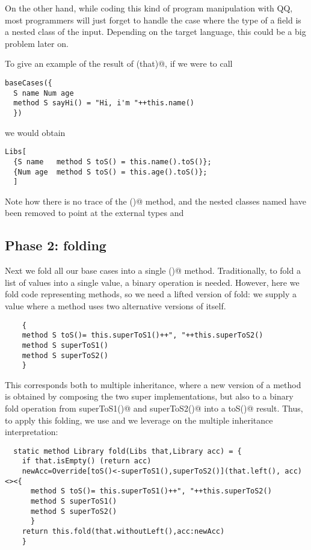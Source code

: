  On the other hand, while coding this kind of program manipulation with QQ, most programmers
 will just forget to handle the case where the type of a field is a nested class of the input.
 Depending on the target language, this could be a big problem later on.


To give an example of the result of \Q@baseCases(that)@, if we were to call 

\begin{lstlisting}
baseCases({
  S name Num age
  method S sayHi() = "Hi, i'm "++this.name()
  })
\end{lstlisting}

 we would obtain

\begin{lstlisting}
Libs[
  {S name   method S toS() = this.name().toS()};
  {Num age  method S toS() = this.age().toS()};
  ]
\end{lstlisting}

Note how there is no trace of the \Q@sayHi()@ method, and the
nested classes named \Q@T@ have been removed to point at the
external types \Q@S@ and \Q@Num@


\subsection*{Phase 2: folding}
Next we fold all our base cases into a single \Q@toS()@ method.
Traditionally, to fold a list of values into a single value, a binary operation is needed.
However, here we fold code representing methods,
so we need a lifted version of fold:
 we supply a \Q@Library@ value where a method
uses two alternative versions of itself. 

\begin{lstlisting}
    {
    method S toS()= this.superToS1()++", "++this.superToS2()
    method S superToS1()
    method S superToS2()
    }
\end{lstlisting}

This corresponds both to multiple inheritance, where a new version of a method is obtained by composing the two super implementations,
but also to a binary fold operation from \Q@S superToS1()@ and \Q@S superToS2()@
into a \Q@S toS()@ result.
Thus, to apply this folding, we use \Q@Override@ and we leverage on the multiple inheritance interpretation:

\begin{lstlisting}
  static method Library fold(Libs that,Library acc) = {
    if that.isEmpty() (return acc)
    newAcc=Override[toS()<-superToS1(),superToS2()](that.left(), acc)<><{
      method S toS()= this.superToS1()++", "++this.superToS2()
      method S superToS1()
      method S superToS2()
      }
    return this.fold(that.withoutLeft(),acc:newAcc)
    }
\end{lstlisting}

